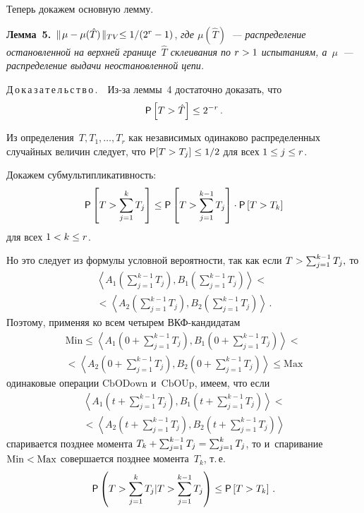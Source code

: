 \begin{multicols}{2}
    \smallskip
    
    Теперь докажем основную лемму.
    
    \smallskip
    
    \noindent
     \textbf{Лемма~5.}\  $\parallel\! \mu-\mu(\hat{T})\!\parallel_{TV}\hm\leq 1/(2^r-1)$, \textit{где 
$\mu(\hat{T})$~--- распределение остановленной на верхней границе~$\hat{T}$ склеивания по 
$r\hm>1$ испытаниям, а~$\mu$~--- распределение выдачи неостановленной цепи.}
     
     \smallskip
     
    \noindent
    Д\,о\,к\,а\,з\,а\,т\,е\,л\,ь\,с\,т\,в\,о\,.\ \ Из-за леммы~4 достаточно 
доказать, что 
    $$
    {\sf P}\left[ T>\hat{T}\right] \leq 2^{-r}\,.
    $$
    
    Из определения~$T, T_1, \ldots , T_r$ как независимых одинаково 
распределенных случайных величин следует, что ${\sf P}[T>T_j]\hm\leq 1/2$ для 
всех $1\hm\leq j\hm\leq r$.
    
    Докажем субмультипликативность: 
    $$
    {\sf P}\left[ T> \sum\limits^k_{j=1} T_j\right] \leq {\sf P}\left[ T> 
\sum\limits_{j=1}^{k-1} T_j\right]\cdot {\sf P}\left[ T>T_k\right]
    $$
    для всех $1\hm < k\hm\leq r$.
    
    Но это следует из формулы условной вероят\-ности, так как если 
    $T\hm> \sum\nolimits_{j=1}^{k-1} T_j,$
    то 
   \begin{multline*}
    \left\langle A_1 \left( \sum\limits_{j=1}^{k-1} T_j\right), B_1\left( 
\sum\limits_{j=1}^{k-1} T_j\right) \right\rangle<{}\\
{}<
    \left\langle A_2\left( \sum\limits_{j=1}^{k-1} T_j\right), B_2\left( 
\sum\limits_{j=1}^{k-1} T_j\right)\right\rangle\,.
    \end{multline*}
        Поэтому, применяя ко всем четырем ВКФ-кан\-ди\-да\-там 
    \begin{multline*}
    \mathrm{Min} \leq \left\langle A_1\left( 0+\sum\limits_{j=1}^{k-1} T_j\right), 
B_1\left(0+\sum\limits_{j=1}^{k-1} T_j\right)\right\rangle<{}\\
    {}< \left\langle A_2\left( 0+\sum\limits_{j=1}^{k-1} T_j\right),
    B_2\left( 0+\sum\limits_{j=1}^{k-1} T_j\right)\right\rangle\leq \mathrm{Max}
    \end{multline*}
одинаковые операции $\mathrm{CbODown}$ и~$\mathrm{CbOUp}$, имеем, что если 
\begin{multline*}
\left\langle A_1\left( t+\sum\limits_{j=1}^{k-1} T_j\right), 
B_1\left(t+\sum\limits_{j=1}^{k-1} T_j\right)\right\rangle<{}\\
    {}< \left\langle A_2\left( t+\sum\limits_{j=1}^{k-1} T_j\right),
B_2\left( t+\sum\limits_{j=1}^{k-1} T_j\right)\right\rangle
\end{multline*}
спаривается позднее момента $T_k\hm+ \sum\nolimits_{j=1}^{k-1} T_j\hm= 
\sum\nolimits^k_{j=1} T_j$, то и~спаривание $\mathrm{Min} \hm< \mathrm{Max}$ совершается 
позднее момента~$T_k$, т.\,е.
$$
{\sf P}\left( T> \sum\limits^k_{j=1} T_j \vert T> \sum\limits_{j=1}^{k-1} T_j\right) 
\leq {\sf P}\left[ T>T_k\right]\,.
$$ 
    

\end{multicols}
